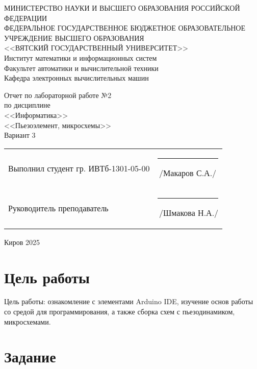 \documentclass[a4paper,14pt]{extarticle}
\begin{document}
  \newpage\thispagestyle{empty}
  \begin{center}
    \MakeUppercase{
      Министерство науки и высшего образования Российской Федерации\\
      Федеральное государственное бюджетное образовательное учреждение высшего образования\\
      <<Вятский Государственный Университет>>\\
    }
    Институт математики и информационных систем\\
    Факультет автоматики и вычислительной техники\\
    Кафедра электронных вычислительных машин
  \end{center}
  \vfill
  
  \begin{center}
    Отчет по лабораторной работе №2\\
    по дисциплине\\
    <<Информатика>>\\
    <<Пьезоэлемент, микросхемы>>\\
    Вариант 3
  \end{center}
  \vfill
  
  \noindent
  \begin{tabular}{ll}
    Выполнил студент гр. ИВТб-1301-05-00 \hspace{5mm} &
    \rule[-1mm]{25mm}{0.10mm}\,/Макаров С.А./\\
    
    Руководитель преподаватель & \rule[-1mm]{25mm}{0.10mm}\,/Шмакова Н.А./\\
  \end{tabular}
  
  \vfill
  \begin{center}
    Киров 2025
  \end{center}

  \newpage
  \section*{\hspace{12.5mm}Цель работы}
  Цель работы: ознакомление с элементами Arduino IDE, изучение
  основ работы со средой для программирования, а также сборка схем с
  пьезодинамиком, микросхемами.

  \section*{\hspace{12.5mm}Задание}
\end{document}
